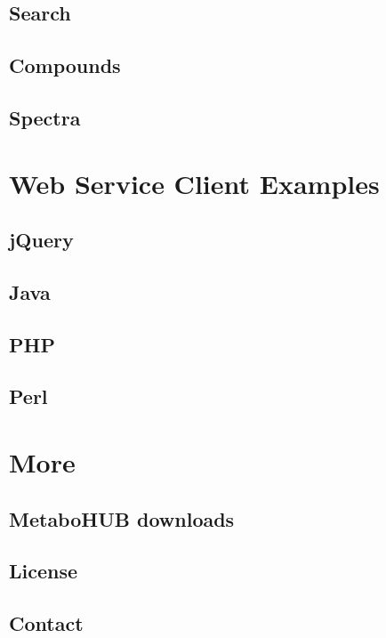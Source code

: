 \subsection{Search}

\subsection{Compounds}

\subsection{Spectra}

%
%

\section{Web Service Client Examples}

\subsection{jQuery}

\subsection{Java}

\subsection{PHP}

\subsection{Perl}

\section{More} %

\subsection{MetaboHUB downloads}

\subsection{License}

\subsection{Contact}

\newpage
\newpage


%
%

